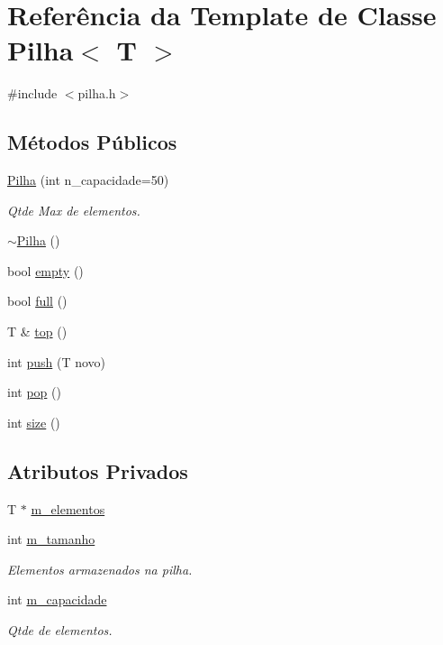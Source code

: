 \hypertarget{classPilha}{}\section{Referência da Template de Classe Pilha$<$ T $>$}
\label{classPilha}


{\ttfamily \#include $<$pilha.\+h$>$}

\subsection*{Métodos Públicos}
\begin{DoxyCompactItemize}
\item 
\hyperlink{classPilha_a3113638095289f155d7c76db4b2da3df}{Pilha} (int n\+\_\+capacidade=50)
\begin{DoxyCompactList}\small\item\em Qtde Max de elementos. \end{DoxyCompactList}\item 
\hyperlink{classPilha_a0c931f49acc17ce09b29c2d589d4fd0b}{$\sim$\+Pilha} ()
\item 
bool \hyperlink{classPilha_a117c819eb1bff51136b7c72b486df0fc}{empty} ()
\item 
bool \hyperlink{classPilha_ae9204010a17accede9ebd6e92c084c15}{full} ()
\item 
T \& \hyperlink{classPilha_adb80016e40c990aa1074f879b1ef7b89}{top} ()
\item 
int \hyperlink{classPilha_a3f80cb860cfa58f459d7f484c9045879}{push} (T novo)
\item 
int \hyperlink{classPilha_a720f99ec51a9d2e3ae2e59ab78365b84}{pop} ()
\item 
int \hyperlink{classPilha_aae0f3f465788cefc53f9cadadc0e1fe0}{size} ()
\end{DoxyCompactItemize}
\subsection*{Atributos Privados}
\begin{DoxyCompactItemize}
\item 
T $\ast$ \hyperlink{classPilha_ac9472d83396997925a13a5e84cb9d3cc}{m\+\_\+elementos}
\item 
int \hyperlink{classPilha_a2a1fc8a625fb4f2405d042561efd8c27}{m\+\_\+tamanho}
\begin{DoxyCompactList}\small\item\em Elementos armazenados na pilha. \end{DoxyCompactList}\item 
int \hyperlink{classPilha_ac10684488abab7128da4058260a24083}{m\+\_\+capacidade}
\begin{DoxyCompactList}\small\item\em Qtde de elementos. \end{DoxyCompactList}\end{DoxyCompactItemize}


